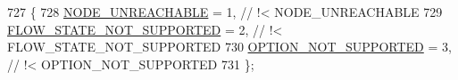 \begin{DoxyCode}
727 \{
728   \hyperlink{group__dsr_gga40f62a50dc031f2853e92211aad095f4adf3df5290f2b4d470e5ea842c44b32e5}{NODE\_UNREACHABLE}  = 1,   \textcolor{comment}{// !< NODE\_UNREACHABLE}
729   \hyperlink{group__dsr_gga40f62a50dc031f2853e92211aad095f4a7031ed624684291a4edb70f1edba2c58}{FLOW\_STATE\_NOT\_SUPPORTED}  = 2,   \textcolor{comment}{// !< FLOW\_STATE\_NOT\_SUPPORTED}
730   \hyperlink{group__dsr_gga40f62a50dc031f2853e92211aad095f4ae18b545e5cad7897bb7182cad1111eec}{OPTION\_NOT\_SUPPORTED}  = 3,   \textcolor{comment}{// !< OPTION\_NOT\_SUPPORTED}
731 \};
\end{DoxyCode}
